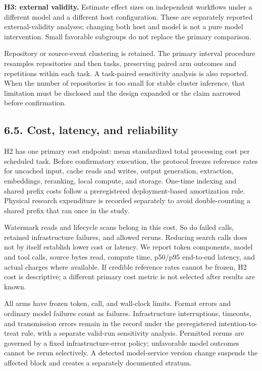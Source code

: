 \documentclass[
  11pt,
  a4paper,
]{article}
\begin{document}
\textbf{H3: external validity.} Estimate effect sizes on independent
workflows under a different model and a different host configuration.
These are separately reported external-validity analyses; changing both
host and model is not a pure model intervention. Small favorable
subgroups do not replace the primary comparison.

Repository or source-event clustering is retained. The primary interval
procedure resamples repositories and then tasks, preserving paired arm
outcomes and repetitions within each task. A task-paired sensitivity
analysis is also reported. When the number of repositories is too small
for stable cluster inference, that limitation must be disclosed and the
design expanded or the claim narrowed before confirmation.

\subsection{6.5. Cost, latency, and
reliability}\label{cost-latency-and-reliability}

H2 has one primary cost endpoint: mean standardized total processing
cost per scheduled task. Before confirmatory execution, the protocol
freezes reference rates for uncached input, cache reads and writes,
output generation, extraction, embeddings, reranking, local compute, and
storage. One-time indexing and shared prefix costs follow a
preregistered deployment-based amortization rule. Physical research
expenditure is recorded separately to avoid double-counting a shared
prefix that ran once in the study.

Watermark reads and lifecycle scans belong in this cost. So do failed
calls, retained infrastructure failures, and allowed reruns. Reducing
search calls does not by itself establish lower cost or latency. We
report token components, model and tool calls, source bytes read,
compute time, p50/p95 end-to-end latency, and actual charges where
available. If credible reference rates cannot be frozen, H2 cost is
descriptive; a different primary cost metric is not selected after
results are known.

All arms have frozen token, call, and wall-clock limits. Format errors
and ordinary model failures count as failures. Infrastructure
interruptions, timeouts, and transmission errors remain in the record
under the preregistered intention-to-treat rule, with a separate
valid-run sensitivity analysis. Permitted reruns are governed by a fixed
infrastructure-error policy; unfavorable model outcomes cannot be rerun
selectively. A detected model-service version change suspends the
affected block and creates a separately documented stratum.
\end{document}
